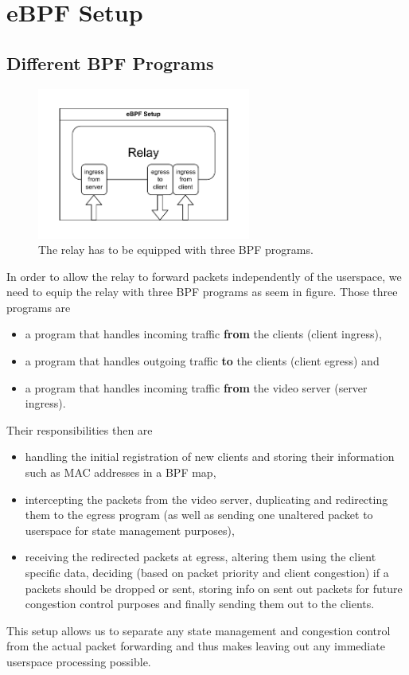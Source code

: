 \section{eBPF Setup}\label{sec:ebpf_setup}
\subsection{Different BPF Programs}
\begin{figure}[htbp]
    \centering
    \includegraphics[width=7cm]{figures/03_fast_relays/ebpf-setup.drawio.pdf}
    \caption[Types of eBPF programs at relay]{The relay has to be equipped with three BPF programs.}\label{fig:ebpf-programs}
\end{figure}

In order to allow the relay to forward packets independently of the userspace, we
need to equip the relay with three BPF programs as seem in figure.
Those three programs are 
\begin{itemize}
    \item a program that handles incoming traffic \textbf{from} the clients (client ingress),
    \item a program that handles outgoing traffic \textbf{to} the clients (client egress) and
    \item a program that handles incoming traffic \textbf{from} the video server (server ingress).
\end{itemize}
Their responsibilities then are
\begin{itemize}
    \item handling the initial registration of new clients and storing their information such as
    MAC addresses in a BPF map,
    \item intercepting the packets from the video server, duplicating and redirecting them to 
    the egress program (as well as sending one unaltered packet to userspace for state
    management purposes),
    \item receiving the redirected packets at egress, altering them using the client specific
    data, deciding (based on packet priority and client congestion) if a packets should be dropped 
    or sent, storing info on sent out packets for future congestion control purposes and finally sending 
    them out to the clients.
\end{itemize}
This setup allows us to separate any state management and congestion control from the actual
packet forwarding and thus makes leaving out any immediate userspace processing possible.

